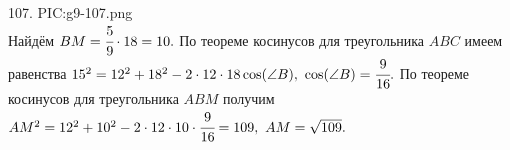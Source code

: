 107. {{PIC:g9-107.png}}\\
Найдём $BM=\cfrac{5}{9}\cdot18=10.$ По теореме косинусов для треугольника $ABC$ имеем равенства $15^2=12^2+18^2-2\cdot12\cdot18\cos(\angle B),\ \cos(\angle B)=\cfrac{9}{16}.$ По теореме косинусов для треугольника $ABM$ получим $AM^2=12^2+10^2-2\cdot12\cdot10\cdot\cfrac{9}{16}=109,\ AM=\sqrt{109}.$\\
